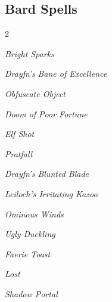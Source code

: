 \documentclass[10pt,a4paper,twoside,bg=print,twocolumn,openany,nodeprecatedcode]{dndbook}
\begin{document}
\subsection{Bard Spells}

\begin{description}
\begin{multicols}{2}
{\par \vspace { 9pt plus 3pt minus 3pt } \noindent  {} \nopagebreak }

\begin{description}
\item \textit{Bright Sparks}
\item \textit{Drayfn's Bane of Excellence}
\item \textit{Obfuscate Object}
\end{description}

{\par \vspace { 9pt plus 3pt minus 3pt } \noindent  {} \nopagebreak }

\begin{description}
\item \textit{Doom of Poor Fortune}
\item \textit{Elf Shot}
\item \textit{Pratfall}
\end{description}

{\par \vspace { 9pt plus 3pt minus 3pt } \noindent  {} \nopagebreak }

\begin{description}
\item \textit{Drayfn's Blunted Blade}
\item \textit{Leiloch's Irritating Kazoo}
\item \textit{Ominous Winds}
\item \textit{Ugly Duckling}
\end{description}

{\par \vspace { 9pt plus 3pt minus 3pt } \noindent  {} \nopagebreak }

\begin{description}
\item \textit{Faerie Toast}
\item \textit{Lost}
\item \textit{Shadow Portal}
\end{description}


\end{multicols}
\end{description}
\end{document}
